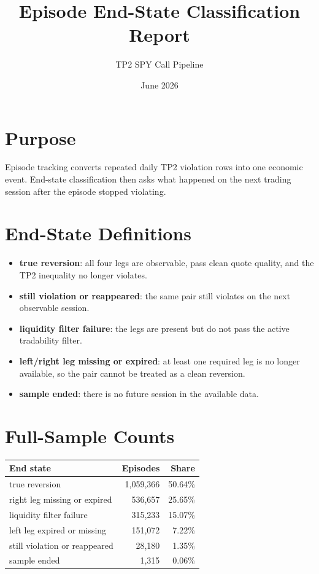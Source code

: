 \documentclass[11pt]{article}
\title{Episode End-State Classification Report}
\author{TP2 SPY Call Pipeline}
\date{June 2026}
\begin{document}
\maketitle

\section*{Purpose}
Episode tracking converts repeated daily TP2 violation rows into one economic
event. End-state classification then asks what happened on the next trading
session after the episode stopped violating.

\section*{End-State Definitions}
\begin{itemize}
  \item \textbf{true reversion}: all four legs are observable, pass clean quote
  quality, and the TP2 inequality no longer violates.
  \item \textbf{still violation or reappeared}: the same pair still violates on
  the next observable session.
  \item \textbf{liquidity filter failure}: the legs are present but do not pass
  the active tradability filter.
  \item \textbf{left/right leg missing or expired}: at least one required leg is
  no longer available, so the pair cannot be treated as a clean reversion.
  \item \textbf{sample ended}: there is no future session in the available data.
\end{itemize}

\section*{Full-Sample Counts}
\begin{center}
\begin{tabular}{lrr}
\toprule
End state & Episodes & Share \\
\midrule
true reversion & 1,059,366 & 50.64\% \\
right leg missing or expired & 536,657 & 25.65\% \\
liquidity filter failure & 315,233 & 15.07\% \\
left leg expired or missing & 151,072 & 7.22\% \\
still violation or reappeared & 28,180 & 1.35\% \\
sample ended & 1,315 & 0.06\% \\
\bottomrule
\end{tabular}
\end{center}
\end{document}
